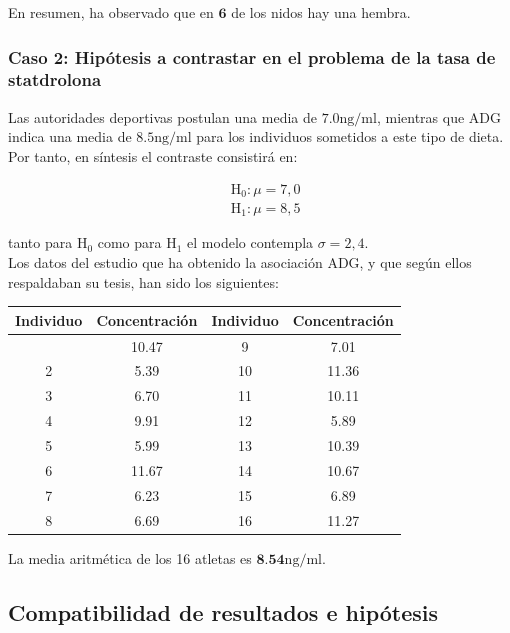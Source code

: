 \documentclass[
]{article}
\begin{document}
En resumen, ha observado que en \(\mathbf{6}\) de los nidos hay una hembra.

\subsubsection{Caso 2: Hipótesis a contrastar en el problema de la tasa de statdrolona}\label{caso-2-hipuxf3tesis-a-contrastar-en-el-problema-de-la-tasa-de-statdrolona}

Las autoridades deportivas postulan una media de \(7.0 \mathrm{ng} / \mathrm{ml}\), mientras que ADG indica una media de \(8.5 \mathrm{ng} / \mathrm{ml}\) para los individuos sometidos a este tipo de dieta. Por tanto, en síntesis el contraste consistirá en:

\[
\begin{aligned}
& \mathrm{H}_{0}: \mu=7,0 \\
& \mathrm{H}_{1}: \mu=8,5
\end{aligned}
\]

tanto para \(\mathrm{H}_{0}\) como para \(\mathrm{H}_{1}\) el modelo contempla \(\sigma=2,4\).\\
Los datos del estudio que ha obtenido la asociación ADG, y que según ellos respaldaban su tesis, han sido los siguientes:

\begin{longtable}[]{@{}cccc@{}}
\toprule\noalign{}
Individuo & Concentración & Individuo & Concentración \\
\midrule\noalign{}
\endhead
\bottomrule\noalign{}
\endlastfoot
1 & 10.47 & 9 & 7.01 \\
2 & 5.39 & 10 & 11.36 \\
3 & 6.70 & 11 & 10.11 \\
4 & 9.91 & 12 & 5.89 \\
5 & 5.99 & 13 & 10.39 \\
6 & 11.67 & 14 & 10.67 \\
7 & 6.23 & 15 & 6.89 \\
8 & 6.69 & 16 & 11.27 \\
\end{longtable}

La media aritmética de los 16 atletas es \(\mathbf{8 . 5 4} \mathrm{ng} / \mathrm{ml}\).

\subsection{Compatibilidad de resultados e hipótesis}\label{compatibilidad-de-resultados-e-hipuxf3tesis}
\end{document}
